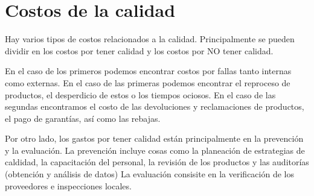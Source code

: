 


\section{Costos de la calidad}

Hay varios tipos de costos relacionados a la calidad. Principalmente se pueden dividir en los costos por tener calidad y los costos por NO tener calidad.

En el caso de los primeros podemos encontrar costos por fallas tanto internas como externas. En el caso de las primeras podemos encontrar el reproceso de productos, el desperdicio de estos o los tiempos ociosos. En el caso de las segundas encontramos el costo de las devoluciones y reclamaciones de productos, el pago de garantías, así como las rebajas.

Por otro lado, los gastos por tener calidad están principalmente en la prevención y la evaluación. La prevención incluye cosas como la planeación de estrategias de caldidad, la capacitación del personal, la revisión de los productos y las auditorías (obtención y análisis de datos) La evaluación consisite en la verificación de los proveedores e inspecciones locales.